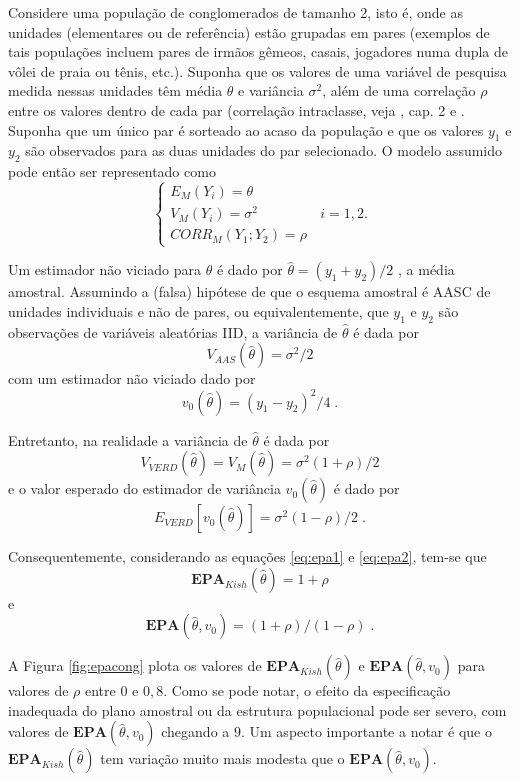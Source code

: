 \documentclass[]{book}
\numberwithin{example}{chapter}
\numberwithin{remark}{chapter}
\numberwithin{definition}{chapter}
\begin{document}
Considere uma população de conglomerados de tamanho 2, isto é, onde as
unidades (elementares ou de referência) estão grupadas em pares
(exemplos de tais populações incluem pares de irmãos gêmeos, casais,
jogadores numa dupla de vôlei de praia ou tênis, etc.). Suponha que os
valores de uma variável de pesquisa medida nessas unidades têm média
\(\theta\) e variância \(\sigma ^{2}\), além de uma correlação \(\rho\)
entre os valores dentro de cada par (correlação intraclasse, veja
\citep{SilvaMou}, cap. 2 e \citep{haggard}. Suponha que um único par é
sorteado ao acaso da população e que os valores \(y_{1}\) e \(y_{2}\)
são observados para as duas unidades do par selecionado. O modelo
assumido pode então ser representado como \[
\left\{ 
\begin{array}{l}
E_{M}\left( Y_{i}\right) =\theta \\ 
V_{M}\left( Y_{i}\right) =\sigma ^{2} \\ 
CORR_{M}\left( Y_{1};Y_{2}\right) =\rho
\end{array}
\right. \;\;i=1,2. 
\]

Um estimador não viciado para \(\theta\) é dado por
\(\widehat{\theta }=(y_{1}+y_{2})/2\) , a média amostral. Assumindo a
(falsa) hipótese de que o esquema amostral é AASC de unidades
individuais e não de pares, ou equivalentemente, que \(y_{1}\) e
\(y_{2}\) são observações de variáveis aleatórias IID, a variância de
\(\widehat{\theta }\) é dada por \[
V_{AAS}\left( \widehat{\theta }\right) =\sigma ^{2}/2 
\] com um estimador não viciado dado por \[
v_{0}\left( \widehat{\theta }\right) =(y_{1}-y_{2})^{2}/4\;. 
\]

Entretanto, na realidade a variância de \(\widehat{\theta }\) é dada por
\[
V_{VERD}\left( \widehat{\theta }\right) =V_{M}\left( \widehat{\theta }
\right) =\sigma ^{2}(1+\rho )/2 
\] e o valor esperado do estimador de variância
\(v_{0}\left( \widehat{\theta }\right)\) é dado por \[
E_{VERD}\left[ v_{0}\left( \widehat{\theta }\right) \right] =\sigma
^{2}(1-\rho )/2\;. 
\]

Consequentemente, considerando as equações \eqref{eq:epa1} e
\eqref{eq:epa2}, tem-se que \[
\mathbf{EPA}_{Kish}\left( \hat{\theta}\right) =1+\rho 
\] e \[
\mathbf{EPA}\left( \hat{\theta},v_{0}\right) =(1+\rho )/(1-\rho )\;. 
\]

A Figura \ref{fig:epacong} plota os valores de
\(\mathbf{EPA}_{Kish}\left( \hat{\theta}\right)\) e
\(\mathbf{EPA}\left( \hat{\theta},v_{0}\right)\) para valores de
\(\rho\) entre \(0\) e \(0,8\). Como se pode notar, o efeito da
especificação inadequada do plano amostral ou da estrutura populacional
pode ser severo, com valores de
\(\mathbf{EPA}\left( \hat{\theta},v_{0}\right)\) chegando a \(9\). Um
aspecto importante a notar é que o
\(\mathbf{EPA}_{Kish}\left( \hat{\theta}\right)\) tem variação muito
mais modesta que o \(\mathbf{EPA}\left( \hat{\theta},v_{0}\right)\).
\end{document}
